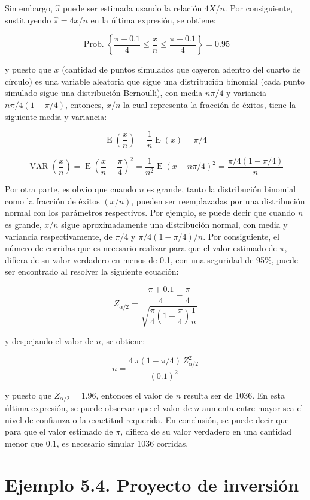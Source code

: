 \documentclass[11pt,letterpaper]{report}
\newcommand{\Prob}{\operatorname{Prob.}}
\newcommand{\E}{\operatorname{E}}
\newcommand{\VAR}{\operatorname{VAR}}
\begin{document}
Sin embargo, $\hat{\pi}$ puede ser estimada usando la relación $4X/n$. Por
consiguiente, sustituyendo $\hat{\pi}=4x/n$ en la última expresión, se
obtiene:

\[
\Prob\left\{\frac{\pi-0.1}{4} \le \frac{x}{n} \le \frac{\pi+0.1}{4}\right\}=0.95
\]

y puesto que $x$ (cantidad de puntos simulados que cayeron adentro del
cuarto de círculo) es una variable aleatoria que sigue una distribución
binomial (cada punto simulado sigue una distribución Bernoulli), con media
$n\pi/4$ y variancia $n\pi/4(1-\pi/4)$, entonces, $x/n$ la cual representa
la fracción de éxitos, tiene la siguiente media y variancia:

\[
\E\!\left(\frac{x}{n}\right)=\frac{1}{n}\E(x)=\pi/4
\]

\[
\VAR\!\left(\frac{x}{n}\right)=\E\!\left(\frac{x}{n}-\frac{\pi}{4}\right)^{2}=\frac{1}{n^{2}}\E(x-n\pi/4)^{2}=\frac{\pi/4(1-\pi/4)}{n}
\]

Por otra parte, es obvio que cuando $n$ es grande, tanto la distribución
binomial como la fracción de éxitos $(x/n)$, pueden ser reemplazadas por
una distribución normal con los parámetros respectivos. Por ejemplo, se
puede decir que cuando $n$ es grande, $x/n$ sigue aproximadamente una
distribución normal, con media y variancia respectivamente, de $\pi/4$ y
$\pi/4(1-\pi/4)/n$. Por consiguiente, el número de corridas que es
necesario realizar para que el valor estimado de $\pi$, difiera de su valor
verdadero en menos de 0.1, con una seguridad de 95\%, puede ser encontrado
al resolver la siguiente ecuación:

\[
Z_{\alpha/2}=\frac{\dfrac{\pi+0.1}{4}-\dfrac{\pi}{4}}{\sqrt{\dfrac{\pi}{4}\left(1-\dfrac{\pi}{4}\right)\dfrac{1}{n}}}
\]

y despejando el valor de $n$, se obtiene:

\[
n=\frac{4\,\pi(1-\pi/4)\,Z_{\alpha/2}^{2}}{(0.1)^{2}}
\]

y puesto que $Z_{\alpha/2}=1.96$, entonces el valor de $n$ resulta ser de
1036. En esta última expresión, se puede observar que el valor de $n$
aumenta entre mayor sea el nivel de confianza o la exactitud requerida. En
conclusión, se puede decir que para que el valor estimado de $\pi$, difiera
de su valor verdadero en una cantidad menor que 0.1, es necesario simular
1036 corridas.

\section*{Ejemplo 5.4. Proyecto de inversión}
\end{document}
